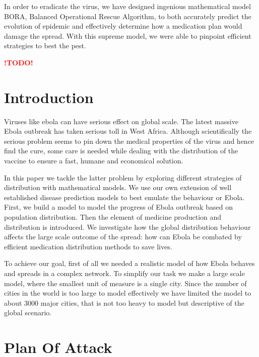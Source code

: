 \documentclass[12pt]{article}
\newcommand{\TD}[0]{\textcolor{red}{\textbf{!TODO!}}}
\begin{document}
In order to eradicate the virus, we have designed ingenious mathematical model BORA, Balanced Operational Rescue Algorithm, to both accurately predict the evolution of epidemic and effectively determine how a medication plan would damage the spread. With this supreme model, we were able to pinpoint efficient strategies to best the pest.

\TD  


\maketitle

\newpage

\section{Introduction}

Viruses like ebola can have serious effect on global scale. The latest massive Ebola outbreak has taken serious toll in West Africa. Although scientifically the serious problem seems to pin down the medical properties of the virus and hence find the cure, some care is needed while dealing with the distribution of the vaccine to ensure a fast, humane and economical solution. 

In this paper we tackle the latter problem by exploring different strategies of distribution with mathematical models. We use our own extension of well established disease prediction models to best emulate the behaviour or Ebola. First, we build a model to model the progress of Ebola outbreak based on population distribution. Then the element of medicine production and distribution is introduced. We investigate how the global distribution behaviour affects the large scale outcome of the spread: how can Ebola be combated by efficient medication distribution methods to save lives.

To achieve our goal, first of all we needed a realistic model of how Ebola behaves and spreads in a complex network. To simplify our task we make a large scale model, where the smallest unit of measure is a single city. Since the number of cities in the world is too large to model effectively we have limited the model to about 3000 major cities, that is not too heavy to model but descriptive of the global scenario.

\newpage
\section{Plan Of Attack}
\end{document}
